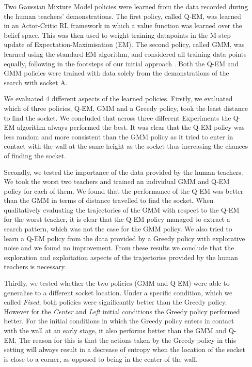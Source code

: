 Two Gaussian Mixture Model policies were learned from the data recorded during the human teachers' demonstrations. 
The first policy, called Q-EM, was learned in an Actor-Critic RL framework in which a value function was learned over 
the belief space. This was then used to weight training datapoints in the M-step update of Expectation-Maximisation (EM). The second 
policy, called GMM, was learned using the standard EM algorithm, and considered all training data points equally,
following in the footsteps of our initial approach \cite{Chambrier2014}. Both the Q-EM and GMM policies were trained 
with data solely from the demonstrations of the search with socket A.

We evaluated 4 different aspects of the learned policies. Firstly, we evaluated which of three policies, Q-EM, GMM and a Greedy policy, 
took the least distance to find the socket. We concluded that across three different Experiments the Q-EM algorithm always performed
the best. It was clear that the Q-EM policy was less random and more consistent than the GMM policy as it tried to enter in 
contact with the wall at the same height as the socket thus increasing the chances of finding the socket.

Secondly, we tested the importance of the data provided by the human teachers. We took the worst two teachers and trained an
individual GMM and Q-EM policy for each of them. We found that the performance of the Q-EM was better than the GMM in terms 
of distance travelled to find the socket. When qualitatively evaluating the trajectories of the GMM with respect to the 
Q-EM for the worst teacher, it is clear that the Q-EM policy managed to extract a search pattern, which was not the case 
for the GMM policy. We also tried to learn a Q-EM policy from the data provided by a Greedy policy with explorative noise 
and we found no improvement. From these results we conclude that the exploration and exploitation aspects of the trajectories 
provided by the human teachers is necessary.

Thirdly, we tested whether the two policies (GMM and Q-EM) were able to generalise to a different socket location. Under a specific condition,
which we called \textit{Fixed}, both policies were significantly better than the Greedy policy. However for the \textit{Center}
and \textit{Left} initial conditions the Greedy policy performed better. For the initial conditions in which the Greedy policy 
enters in contact with the wall at an early stage, it also performs better than the GMM and Q-EM. The reason for this is that  
the actions taken by the Greedy policy in this setting will always result in a decrease of entropy when the location
of the socket is close to a corner, as opposed to being in the center of the wall.

